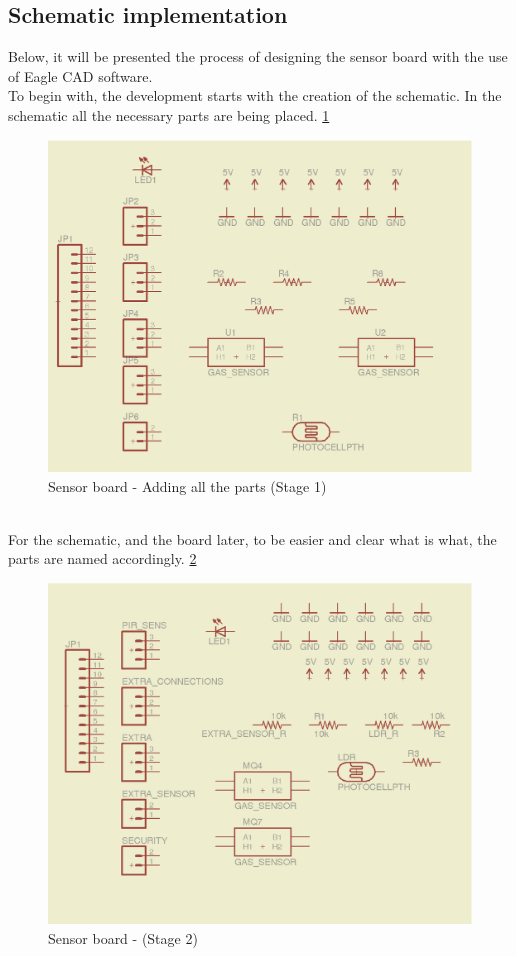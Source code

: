 \documentclass[12pt,a4paper,draft]{report}
\begin{document}
\subsection{Schematic implementation}
Below, it will be presented the process of designing the sensor board with the use of Eagle CAD software.
\ \\
To begin with, the development starts with the creation of the schematic. In the schematic all the necessary parts are being placed. \ref{Sensor-brd-s1}
\ \\
\begin{figure}[H]
\centering
\includegraphics*[scale=0.25]{sens_brd_s1}
\caption{Sensor board - Adding all the parts (Stage 1)}
\label{Sensor-brd-s1}
\end{figure}
\ \\
For the schematic, and the board later, to be easier and clear what is what, the parts are named accordingly. \ref{Sensor-brd-s2}
\begin{figure}[H]
\centering
\includegraphics*[scale=0.25]{sens_brd_s2}
\caption{Sensor board -  (Stage 2)}
\label{Sensor-brd-s2}
\end{figure}
\end{document}

